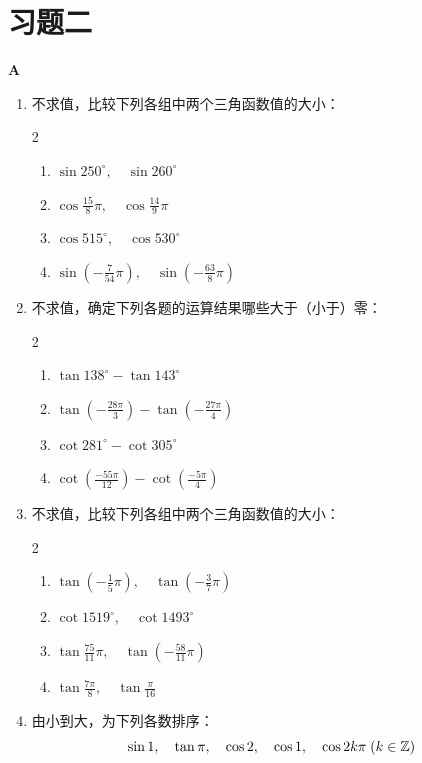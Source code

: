 \section*{习题二}
\begin{center}
    \bfseries A
\end{center}
\begin{enumerate}
\item 不求值，比较下列各组中两个三角函数值的大小：
\begin{multicols}{2}
\begin{enumerate}[(1)]
    \item $\sin250^{\circ},\quad \sin260^{\circ}$
    \item $\cos\frac{15}{8}\pi,\quad \cos\frac{14}{9}\pi$
    \item $\cos515^{\circ},\quad \cos530^{\circ}$
    \item $\sin\left(-\frac{7}{54}\pi\right),\quad \sin\left(-\frac{63}{8}\pi\right)$
\end{enumerate}
\end{multicols}
\item 不求值，确定下列各题的运算结果哪些大于（小于）零：
\begin{multicols}{2}
\begin{enumerate}[(1)]
    \item $\tan 138^{\circ}-\tan143^{\circ}$
    \item $\tan\left(-\frac{28\pi}{3}\right)-\tan\left(-\frac{27\pi}{4}\right)$
    \item $\cot281^{\circ}-\cot305^{\circ}$
    \item $\cot\left(\frac{-55\pi}{12}\right)-\cot\left(\frac{-5\pi}{4}\right)$
\end{enumerate}
\end{multicols}
\item 不求值，比较下列各组中两个三角函数值的大小：
\begin{multicols}{2}
\begin{enumerate}[(1)]
    \item $\tan\left(-\frac{1}{5}\pi\right),\quad \tan\left(-\frac{3}{7}\pi\right)$
    \item $\cot1519^{\circ},\quad \cot1493^{\circ}$
    \item $\tan\frac{75}{11}\pi,\quad \tan\left(-\frac{58}{11}\pi\right)$
    \item $\tan\frac{7\pi}{8},\quad \tan\frac{\pi}{16}$
\end{enumerate}
\end{multicols}
\item 由小到大，为下列各数排序：
\[\sin 1,\quad \tan\pi,\quad \cos 2,\quad \cos 1,\quad \cos2k\pi\; (k\in\mathbb{Z})\]


\end{enumerate}
